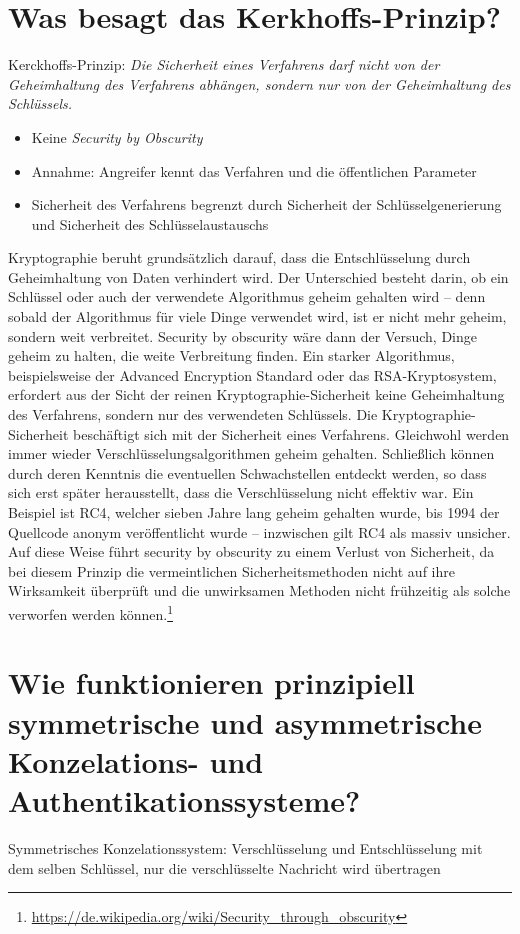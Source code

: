 \documentclass{article}
\begin{document}
	\section*{Was besagt das Kerkhoffs-Prinzip?}
	Kerckhoffs-Prinzip: \textit{Die Sicherheit eines Verfahrens darf nicht von der Geheimhaltung des Verfahrens abhängen, sondern nur von der Geheimhaltung des Schlüssels.}
	\begin{itemize}
		\item Keine \textit{Security by Obscurity}
		\item Annahme: Angreifer kennt das Verfahren und die öffentlichen Parameter
		\item Sicherheit des Verfahrens begrenzt durch Sicherheit der Schlüsselgenerierung und Sicherheit des Schlüs\-selaustauschs
	\end{itemize}
	Kryptographie beruht grundsätzlich darauf, dass die Entschlüsselung durch Geheimhaltung von Daten verhindert wird. Der Unterschied besteht darin, ob ein Schlüssel oder auch der verwendete Algorithmus geheim gehalten wird – denn sobald der Algorithmus für viele Dinge verwendet wird, ist er nicht mehr geheim, sondern weit verbreitet. Security by obscurity wäre dann der Versuch, Dinge geheim zu halten, die weite Verbreitung finden. Ein starker Algorithmus, beispielsweise der Advanced Encryption Standard oder das RSA-Kryptosystem, erfordert aus der Sicht der reinen Kryptographie-Sicherheit keine Geheimhaltung des Verfahrens, sondern nur des verwendeten Schlüssels. Die Kryptographie-Sicherheit beschäftigt sich mit der Sicherheit eines Verfahrens. Gleichwohl werden immer wieder Verschlüsselungsalgorithmen geheim gehalten. Schließlich können durch deren Kenntnis die eventuellen Schwachstellen entdeckt werden, so dass sich erst später herausstellt, dass die Verschlüsselung nicht effektiv war. Ein Beispiel ist RC4, welcher sieben Jahre lang geheim gehalten wurde, bis 1994 der Quellcode anonym veröffentlicht wurde – inzwischen gilt RC4 als massiv unsicher. Auf diese Weise führt security by obscurity zu einem Verlust von Sicherheit, da bei diesem Prinzip die vermeintlichen Sicherheitsmethoden nicht auf ihre Wirksamkeit überprüft und die unwirksamen Methoden nicht frühzeitig als solche verworfen werden können.\footnote{\url{https://de.wikipedia.org/wiki/Security_through_obscurity}}
	
	\section*{Wie funktionieren prinzipiell symmetrische und asymmetrische Kon\-zelations- und Authentikationssysteme?}
	Symmetrisches Konzelationssystem: Verschlüsselung und Entschlüsselung mit dem selben Schlüssel, nur die verschlüsselte Nachricht wird übertragen
	
\end{document}
